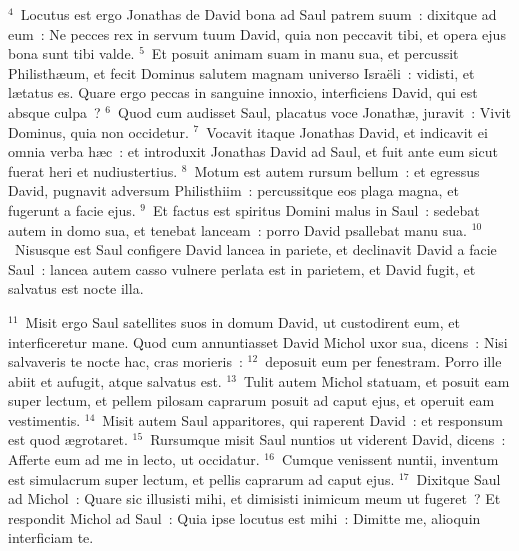${}^{4}$~Locutus est ergo Jonathas de David bona ad Saul patrem suum~: dixitque ad eum~: Ne pecces rex in servum tuum David, quia non peccavit tibi, et opera ejus bona sunt tibi valde.
${}^{5}$~Et posuit animam suam in manu sua, et percussit Philisth\ae um, et fecit Dominus salutem magnam universo Isra\"eli~: vidisti, et l\ae tatus es. Quare ergo peccas in sanguine innoxio, interficiens David, qui est absque culpa~?
${}^{6}$~Quod cum audisset Saul, placatus voce Jonath\ae , juravit~: Vivit Dominus, quia non occidetur.
${}^{7}$~Vocavit itaque Jonathas David, et indicavit ei omnia verba h\ae c~: et introduxit Jonathas David ad Saul, et fuit ante eum sicut fuerat heri et nudiustertius.
${}^{8}$~Motum est autem rursum bellum~: et egressus David, pugnavit adversum Philisthiim~: percussitque eos plaga magna, et fugerunt a facie ejus.
${}^{9}$~Et factus est spiritus Domini malus in Saul~: sedebat autem in domo sua, et tenebat lanceam~: porro David psallebat manu sua.
${}^{10}$~Nisusque est Saul configere David lancea in pariete, et declinavit David a facie Saul~: lancea autem casso vulnere perlata est in parietem, et David fugit, et salvatus est nocte illa.


${}^{11}$~Misit ergo Saul satellites suos in domum David, ut custodirent eum, et interficeretur mane. Quod cum annuntiasset David Michol uxor sua, dicens~: Nisi salvaveris te nocte hac, cras morieris~:
${}^{12}$~deposuit eum per fenestram. Porro ille abiit et aufugit, atque salvatus est.
${}^{13}$~Tulit autem Michol statuam, et posuit eam super lectum, et pellem pilosam caprarum posuit ad caput ejus, et operuit eam vestimentis.
${}^{14}$~Misit autem Saul apparitores, qui raperent David~: et responsum est quod \ae grotaret.
${}^{15}$~Rursumque misit Saul nuntios ut viderent David, dicens~: Afferte eum ad me in lecto, ut occidatur.
${}^{16}$~Cumque venissent nuntii, inventum est simulacrum super lectum, et pellis caprarum ad caput ejus.
${}^{17}$~Dixitque Saul ad Michol~: Quare sic illusisti mihi, et dimisisti inimicum meum ut fugeret~? Et respondit Michol ad Saul~: Quia ipse locutus est mihi~: Dimitte me, alioquin interficiam te.



